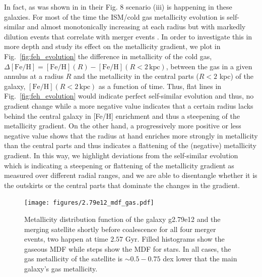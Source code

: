 \documentclass[useAMS,usenatbib]{mnras}
\begin{document}
In fact, as was shown in \citet{Buck2020} in their Fig. 8 scenario (iii) is happening in these galaxies. For most of the time the ISM/cold gas metallicity evolution is self-similar and almost monotonically increasing at each radius but with markedly dilution events that correlate with merger events \citep[see also][]{Sparre2022}. In order to investigate this in more depth and study its effect on the metallicity gradient, we plot in Fig.~\ref{fig:feh_evolution} the difference in metallicity of the cold gas, $\Delta\mathrm{[Fe/H]}=\mathrm{[Fe/H]}(R)-\mathrm{[Fe/H]}(R<2\, \mathrm{kpc})$, between the gas in a given annulus at a radius $R$ and the metallicity in the central parts ($R<2$ kpc) of the galaxy, $\mathrm{[Fe/H]}(R<2\, \mathrm{kpc})$ as a function of time. Thus, flat lines in Fig.~\ref{fig:feh_evolution} would indicate perfect self-similar evolution and thus, no gradient change while a more negative value indicates that a certain radius lacks behind the central galaxy in [Fe/H] enrichment and thus a steepening of the metallicity gradient. On the other hand, a progressively more positive or less negative value shows that the radius at hand enriches more strongly in metallicity than the central parts and thus indicates a flattening of the (negative) metallicity gradient. In this way, we highlight deviations from the self-similar evolution which is indicating a steepening or flattening of the metallicity gradient as measured over different radial ranges, and we are able to disentangle whether it is the outskirts or the central parts that dominate the changes in the gradient. 

\begin{figure}
    \begin{centering}
        \texttt{[image: figures/2.79e12\_mdf\_gas.pdf]}
        \vspace*{-1.75em}
        \caption{
            Metallicity distribution function of the galaxy g2.79e12 and the merging satellite shortly before coalescence for all four merger events, two happen at time $2.57$ Gyr. Filled histograms show the gaseous MDF while steps show the MDF for stars. In all cases, the gas metallicity of the satellite is $\sim0.5-0.75$ dex lower that the main galaxy's gas metallicity.
        }
        \label{fig:mdf}
    \end{centering}
\end{figure}
\end{document}
